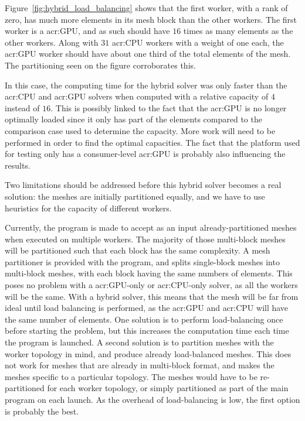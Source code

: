 Figure~\ref{fig:hybrid_load_balancing} shows that the first worker, with a rank of zero, has much
more elements in its mesh block than the other workers. The first worker is a \acrshort{acr:GPU},
and as such should have \(16\) times as many elements as the other workers. Along with \(31\)
\acrshort{acr:CPU} workers with a weight of one each, the \acrshort{acr:GPU} worker should have
about one third of the total elements of the mesh. The partitioning seen on the figure corroborates
this. 

In this case, the computing time for the hybrid solver was only faster than the \acrshort{acr:CPU}
and \acrshort{acr:GPU} solvers when computed with a relative capacity of \(4\) instead of \(16\).
This is possibly linked to the fact that the \acrshort{acr:GPU} is no longer optimally loaded since
it only has part of the elements compared to the comparison case used to determine the capacity.
More work will need to be performed in order to find the optimal capacities. The fact that the
platform used for testing only has a consumer-level \acrshort{acr:GPU} is probably also influencing
the results. 

Two limitations should be addressed before this hybrid solver becomes a real solution: the meshes
are initially partitioned equally, and we have to use heuristics for the capacity of different
workers. 

Currently, the program is made to accept as an input already-partitioned meshes when executed on
multiple workers. The majority of those multi-block meshes will be partitioned such that each block
has the same complexity. A mesh partitioner is provided with the program, and splits single-block
meshes into multi-block meshes, with each block having the same numbers of elements. This poses no
problem with a \acrshort{acr:GPU}-only or \acrshort{acr:CPU}-only solver, as all the workers will be
the same. With a hybrid solver, this means that the mesh will be far from ideal until load balancing
is performed, as the \acrshort{acr:GPU} and \acrshort{acr:CPU} will have the same number of
elements. One solution is to perform load-balancing once before starting the problem, but this
increases the computation time each time the program is launched. A second solution is to partition
meshes with the worker topology in mind, and produce already load-balanced meshes. This does not
work for meshes that are already in multi-block format, and makes the meshes specific to a
particular topology. The meshes would have to be re-partitioned for each worker topology, or simply
partitioned as part of the main program on each launch. As the overhead of load-balancing is low,
the first option is probably the best.

